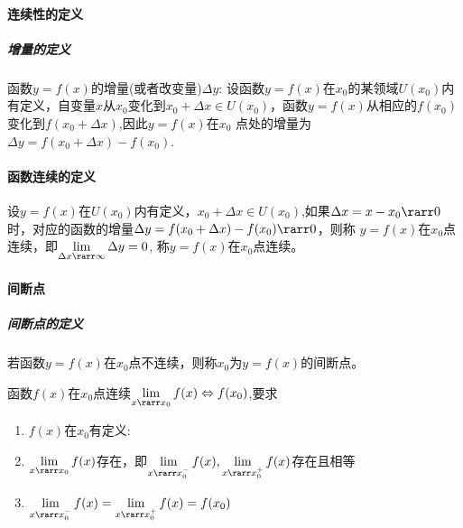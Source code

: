 \documentclass[
]{article}
\begin{document}
\hypertarget{ux8fdeux7eedux6027ux7684ux5b9aux4e49}{%
\paragraph{连续性的定义}\label{ux8fdeux7eedux6027ux7684ux5b9aux4e49}}

\hypertarget{ux589eux91cfux7684ux5b9aux4e49}{%
\subparagraph{增量的定义}\label{ux589eux91cfux7684ux5b9aux4e49}}

函数\(y = f(x)\)的增量(或者改变量)\(\Delta y\):
设函数\(y = f(x)\)在\(x_0\)的某领域\(U(x_0)\)内有定义，自变量\(x\)从\(x_0 \)变化到\(x_0 + \Delta x  \in U(x_0)\)，函数\(y=f(x)\)从相应的\(f(x_0)\)变化到\(f(x_0 + \Delta x)\),因此\(y = f(x)\)在\(x_0\)
点处的增量为\(\Delta y =f(x_0 + \Delta x)- f(x_0)\).

\hypertarget{ux51fdux6570ux8fdeux7eedux7684ux5b9aux4e49}{%
\paragraph{函数连续的定义}\label{ux51fdux6570ux8fdeux7eedux7684ux5b9aux4e49}}

设\(y = f(x)\)在\(U(x_0)\)内有定义，\(x_0+\Delta x \in U(x_0)\),如果\(\Delta x = x - x_0 \rarr 0\)时，对应的函数的增量\(\Delta y = f(x_0+ \Delta x)-f(x_0) \rarr 0\)，则称
\(y = f(x)\)在\(x_0\)点连续，即\(\lim \limits_{\Delta x \rarr \infty }\Delta y = 0\),
称\(y = f(x)\)在\(x_0\)点连续。

\hypertarget{ux95f4ux65adux70b9}{%
\paragraph{间断点}\label{ux95f4ux65adux70b9}}

\hypertarget{ux95f4ux65adux70b9ux7684ux5b9aux4e49}{%
\subparagraph{间断点的定义}\label{ux95f4ux65adux70b9ux7684ux5b9aux4e49}}

若函数\(y = f(x)\)在\(x_0\)点不连续，则称\(x_0\)为\(y =f(x)\)的间断点。

函数\(f(x)\)在\(x_0\)点连续\(\lim \limits_{x \rarr x_0} f(x) \Leftrightarrow f(x_0) \),要求

\begin{enumerate}
\def\labelenumi{\arabic{enumi}.}
\item
  \(f(x)\)在\(x_0 \)有定义:
\item
  \(\lim \limits_{x \rarr x_0}f(x)\)存在，即\(\lim\limits_{x \rarr x_0^-}f(x),\lim\limits_{x \rarr x_0^+}f(x)\)存在且相等
\item
  \(\lim\limits_{x \rarr x_0^-}f(x)=\lim\limits_{x \rarr x_0^+}f(x)=f(x_0)\)
\end{enumerate}
\end{document}
